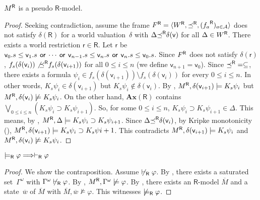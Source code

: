   \begin{proposition}
   ${M}^{\mathsf R}$ is a pseudo $\mathsf R$-model.
  \end{proposition}
  \begin{proof}
   Seeking contradiction,
   assume the frame ${F}^{\mathsf R} = \langle{{W}^{\mathsf R}, {\preceq}^{\mathsf R}, ({f_a}^{\mathsf R})_{a\in\mathcal A}}\rangle$
   does not satisfy $\delta(\mathsf R)$ for
   a world valuation~$\delta$ with
   $\Delta{\preceq}^{\mathsf R}\delta(\mathsf v)$ for all $\Delta\in{W}^{\mathsf R}$.
   There exists a world restriction
   $\mathsf r\in\mathsf R$.
   Let $\mathsf r$ be $\mathsf v_0.s\le\mathsf v_1.s\,\mathbin{\mathsf{or}}\,\cdots \,\mathbin{\mathsf{or}}\,\mathsf
   v_{n-1}.s\le\mathsf v_n.s\,\mathbin{\mathsf{or}}\,\mathsf v_n.s\le\mathsf v_0.s$.
   Since ${F}^{\mathsf R}$ does not satisfy $\delta(\mathsf r)$,
   $f_s(\delta(\mathsf v_i))\not{{\preceq}^{\mathsf R}}f_s(\delta(\mathsf v_{i+1}))$
   for
   all $0\le i\le n$ (we define $\mathsf v_{n+1} = \mathsf v_0$).
   Since ${\preceq}^{\mathsf R} = \subseteq$, there exists
   a formula $\psi_i\in f_s(\delta(\mathsf v_{i+1}))\setminus
   f_s(\delta(\mathsf v_i))$ for every $0\le i\le n$.
   In other words, $K_s\psi_i\in\delta(\mathsf v_{i+1})$
   but $K_s\psi_i\notin\delta(\mathsf v_i)$.
   By ,
   ${M}^{\mathsf R},\delta(\mathsf v_{i+1})\models K_s\psi_i$ but
   ${M}^{\mathsf R},\delta(\mathsf v_{i})\not\models K_s\psi_i$.
   On the other hand, $\mathbf{Ax}(\mathsf R)$ contains
   $\bigvee_{0\le i\le n}\left(K_s\psi_i\supset K_s\psi_{i+1}\right)$.
   So, for some $0\le i\le n$,
   $K_s\psi_i\supset K_s\psi_{i+1}\in\Delta$.
   This means, by ,
   ${M}^{\mathsf R},\Delta\models K_s\psi_i\supset K_s\psi_{i+1}$.
   Since $\Delta{\preceq}^{\mathsf R}\delta(\mathsf v_i)$,
   by Kripke monotonicity (),
   ${M}^{\mathsf R},\delta(\mathsf v_{i+1})\models K_s\psi_i\supset K_s\psi{i+1}$.
   This contradicts ${M}^{\mathsf R},\delta(\mathsf v_{i+1})\models K_s\psi_i$ and
   ${M}^{\mathsf R},\delta(\mathsf v_i)\not\models K_s\psi_i$.
  \end{proof}

  \begin{lemma}[Completeness]
   $\models_{\mathsf R}\varphi\Longrightarrow\vdash_{\mathsf R}\varphi$
  \end{lemma}
  \begin{proof}
   We show the contraposition.
   Assume $\not\vdash_{\mathsf R} \varphi$. By
   , there exists
   a saturated set~$\Gamma^\omega$ with $\Gamma^\omega\not\vdash_{\mathsf R}\varphi$.
   By , ${M}^{\mathsf R}, \Gamma^\omega\not\models\varphi$.
   By , there exists an
   $\mathsf R$-model $\overline M$ and a state~$\overline w$ of $\overline M$
   with $\overline M,\overline w\not\models \varphi$.
   This witnesses $\not\models_{\mathsf R}\varphi$.
  \end{proof}

